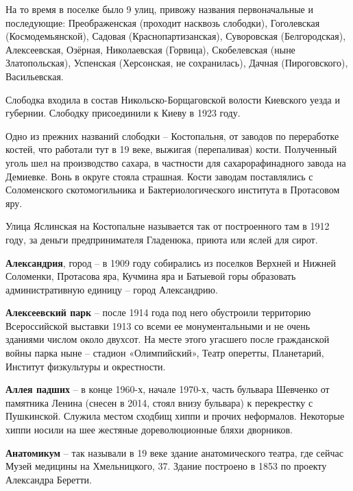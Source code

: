На то время в поселке было 9 улиц, привожу названия первоначальные и последующие: Преображенская (проходит насквозь слободки), Гоголевская (Космодемьянской), Садовая (Краснопартизанская), Суворовская (Белгородская), Алексеевская, Озёрная, Николаевская (Горвица), Скобелевская (ныне Златопольская), Успенская (Херсонская, не сохранилась), Дачная (Пироговского),  Васильевская.

Слободка входила в состав Никольско-Борща\-говской волости Киевского уезда и губернии. Слободку присоединили к Киеву в 1923 году.

Одно из прежних названий слободки – Костопальня, от заводов по переработке костей, что работали тут в 19 веке, выжигая (перепаливая) кости. Полученный уголь шел на производство сахара, в частности для сахарорафинадного завода на Демиевке. Вонь в округе стояла страшная. Кости заводам поставлялись с Соломенского скотомогильника и Бактериологического института в Протасовом яру.

Улица Яслинская на Костопальне называется так от построенного там в 1912 году, за деньги предпринимателя Гладенюка, приюта или яслей для сирот.\\

\medskip

\textbf{Александрия}, город – в 1909 году собирались из поселков Верхней и Нижней Соломенки, Протасова яра, Кучмина яра и Батыевой горы образовать административную единицу – город Александрию.\\

\medskip

\textbf{Алексеевский парк} – после 1914 года под него обустроили территорию Всероссийской выставки 1913 со всеми ее монументальными и не очень зданиями числом около двухсот. На месте этого угасшего после гражданской войны парка ныне – стадион «Олимпийский», Театр оперетты, Планетарий, Институт физкультуры и окрестности.\\

\medskip

\textbf{Аллея падших} – в конце 1960-х, начале 1970-х, часть бульвара Шевченко от памятника Ленина (снесен в 2014, стоял внизу бульвара) к перекрестку с Пушкинской. Служила местом сходбищ хиппи и прочих неформалов. Некоторые хиппи носили на шее жестяные дореволюционные бляхи дворников.\\

\medskip

\textbf{Анатомикум} – так называли в 19 веке здание анатомического театра, где сейчас Музей медицины на Хмельницкого, 37. Здание построено в 1853 по проекту Александра Беретти.\\

